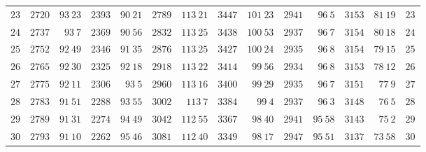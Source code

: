 \begin{GaussVICeresFrame}{.92}
{\begin{tabular}{r@{\GaussVICeresRule}r|r@{\GaussVICeresRule}r|r@{\GaussVICeresRule}r|r@{\GaussVICeresRule}r|r@{\GaussVICeresRule}r|r@{\GaussVICeresRule}r|r@{\GaussVICeresRule}r}
$23$ & $2720$ & $93\ 23$ & $2393$ & $90\ 21$ & $2789$ & $113\ 21$ & $3447$ & $101\ 23$ & $2941$ & $96\ 5$ & $3153$ & $81\ 19$ & $23$ \\
$24$ & $2737$ & $93\ 7$ & $2369$ & $90\ 56$ & $2832$ & $113\ 25$ & $3438$ & $100\ 53$ & $2937$ & $96\ 7$ & $3154$ & $80\ 18$ & $24$ \\
$25$ & $2752$ & $92\ 49$ & $2346$ & $91\ 35$ & $2876$ & $113\ 25$ & $3427$ & $100\ 24$ & $2935$ & $96\ 8$ & $3154$ & $79\ 15$ & $25$ \\[3pt]
$26$ & $2765$ & $92\ 30$ & $2325$ & $92\ 18$ & $2918$ & $113\ 22$ & $3414$ & $99\ 56$ & $2934$ & $96\ 8$ & $3153$ & $78\ 12$ & $26$ \\
$27$ & $2775$ & $92\ 11$ & $2306$ & $93\ 5$ & $2960$ & $113\ 16$ & $3400$ & $99\ 29$ & $2935$ & $96\ 7$ & $3151$ & $77\ 9$ & $27$ \\
$28$ & $2783$ & $91\ 51$ & $2288$ & $93\ 55$ & $3002$ & $113\ 7$ & $3384$ & $99\ 4$ & $2937$ & $96\ 3$ & $3148$ & $76\ 5$ & $28$ \\
$29$ & $2789$ & $91\ 31$ & $2274$ & $94\ 49$ & $3042$ & $112\ 55$ & $3367$ & $98\ 40$ & $2941$ & $95\ 58$ & $3143$ & $75\ 2$ & $29$ \\
$30$ & $2793$ & $91\ 10$ & $2262$ & $95\ 46$ & $3081$ & $112\ 40$ & $3349$ & $98\ 17$ & $2947$ & $95\ 51$ & $3137$ & $73\ 58$ & $30$ \\
\end{tabular}\par}
\end{GaussVICeresFrame}

